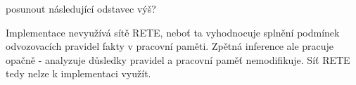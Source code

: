 \begin{framed}
  posunout následující odstavec výš?
\end{framed}

Implementace nevyužívá sítě RETE, neboť ta vyhodnocuje splnění podmínek
odvozovacích pravidel fakty v pracovní paměti. Zpětná inference ale pracuje
opačně - analyzuje důsledky pravidel a pracovní paměť nemodifikuje. Síť RETE
tedy nelze k implementaci využít.
